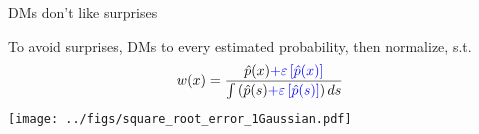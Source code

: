 \begin{frame}{DMs don't like surprises}

To avoid surprises, DMs  to every estimated probability, then normalize, s.t.
\begin{equation}
	w(x)=\frac{\hat{p}(x)\textcolor{blue}{+\varepsilon\left[\hat{p}(x)\right]}}{\int \left(\hat{p}(s) \textcolor{blue}{+\varepsilon\left[\hat{p}(s)\right]} \right)ds}
\end{equation}
\pause
\centering
	\texttt{[image: ../figs/square\_root\_error\_1Gaussian.pdf]} \\
\end{frame}


%
%
%
%
%

